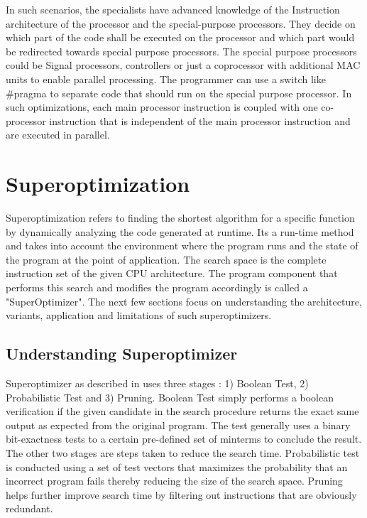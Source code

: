 \documentclass[sigconf]{acmart}
\begin{document}
In such scenarios, the specialists have advanced knowledge of the Instruction architecture of the processor and the special-purpose processors. They decide on which part of the code shall be executed on the processor and which part would be redirected towards special purpose processors. The special purpose processors could be Signal processors, controllers or just a coprocessor with additional MAC units to enable parallel processing. The programmer can use a switch like \#pragma to separate code that should run on the special purpose processor. In such optimizations, each main processor instruction is coupled with one co-processor instruction that is independent of the main processor instruction and are executed in parallel. 


\section{Superoptimization}

Superoptimization refers to finding the shortest algorithm for a specific function by dynamically analyzing the code generated at runtime. Its a run-time method and takes into account the environment where the program runs and the state of the program at the point of application. The search space is the complete instruction set of the given CPU architecture. The program component that performs this search and modifies the program accordingly is called a "SuperOptimizer". The next few sections focus on understanding the architecture, variants, application and limitations of such superoptimizers.

\subsection{Understanding Superoptimizer}

Superoptimizer as described in \cite{superopt87} uses three stages : 1) Boolean Test, 2) Probabilistic Test and 3) Pruning. Boolean Test simply performs a boolean verification if the given candidate in the search procedure returns the exact same output as expected from the original program. The test generally uses a binary bit-exactness tests to a certain pre-defined set of minterms to conclude the result.
The other two stages are steps taken to reduce the search time. 
Probabilistic test is conducted using a set of test vectors that maximizes the probability that an incorrect program fails thereby reducing the size of the search space. 
Pruning helps further improve search time by filtering out instructions that are obviously redundant. 
\end{document}
